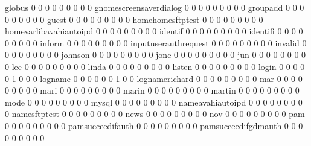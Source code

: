 \documentclass[compress,8pt]{beamer}
\begin{document}
\begin{frame}
\begin{Schunk}
  globus                                     0   0   0   0   0   0   0   0   0
  gnomescreensaverdialog                     0   0   0   0   0   0   0   0   0
  groupadd                                   0   0   0   0   0   0   0   0   0
  guest                                      0   0   0   0   0   0   0   0   0
  homehomesftptest                           0   0   0   0   0   0   0   0   0
  homevarlibavahiautoipd                     0   0   0   0   0   0   0   0   0
  identif                                    0   0   0   0   0   0   0   0   0
  identifi                                   0   0   0   0   0   0   0   0   0
  inform                                     0   0   0   0   0   0   0   0   0
  inputuserauthrequest                       0   0   0   0   0   0   0   0   0
  invalid                                    0   0   0   0   0   0   0   0   0
  johnson                                    0   0   0   0   0   0   0   0   0
  jone                                       0   0   0   0   0   0   0   0   0
  jun                                        0   0   0   0   0   0   0   0   0
  lee                                        0   0   0   0   0   0   0   0   0
  linda                                      0   0   0   0   0   0   0   0   0
  listen                                     0   0   0   0   0   0   0   0   0
  login                                      0   0   0   0   0   1   0   0   0
  logname                                    0   0   0   0   0   0   1   0   0
  lognamerichard                             0   0   0   0   0   0   0   0   0
  mar                                        0   0   0   0   0   0   0   0   0
  mari                                       0   0   0   0   0   0   0   0   0
  marin                                      0   0   0   0   0   0   0   0   0
  martin                                     0   0   0   0   0   0   0   0   0
  mode                                       0   0   0   0   0   0   0   0   0
  mysql                                      0   0   0   0   0   0   0   0   0
  nameavahiautoipd                           0   0   0   0   0   0   0   0   0
  namesftptest                               0   0   0   0   0   0   0   0   0
  news                                       0   0   0   0   0   0   0   0   0
  nov                                        0   0   0   0   0   0   0   0   0
  pam                                        0   0   0   0   0   0   0   0   0
  pamsucceedifauth                           0   0   0   0   0   0   0   0   0
  pamsucceedifgdmauth                        0   0   0   0   0   0   0   0   0

\end{Schunk}
\end{frame}
\end{document}
